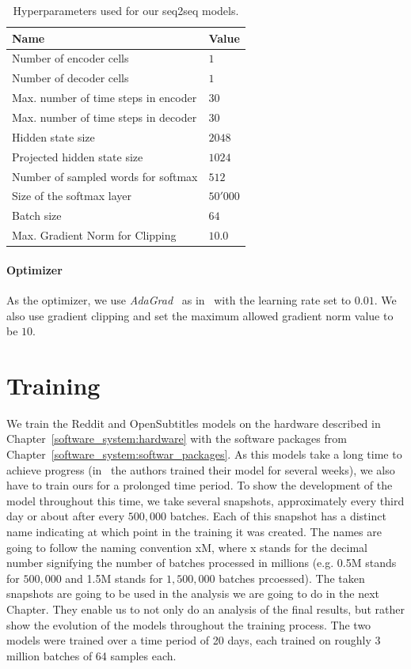 \begin{table}[H]
	\centering
	\begin{adjustbox}{max width=\textwidth}
		\begin{tabular}{ll}
			\toprule
			Name & Value\\ \midrule
			Number of encoder cells & $1$\\
			Number of decoder cells & $1$\\
			Max. number of time steps in encoder & $30$\\
			Max. number of time steps in decoder & $30$\\
			Hidden state size & $2048$\\
			Projected hidden state size & $1024$\\
			Number of sampled words for softmax & $512$\\
			Size of the softmax layer & $50'000$\\
			Batch size & $64$\\
			Max. Gradient Norm for Clipping & $10.0$\\
			\bottomrule
		\end{tabular}
	\end{adjustbox}
	\caption{Hyperparameters used for our seq2seq models.}
	\label{methods:hyperparameters:table}
\end{table}

\paragraph{Optimizer} As the optimizer, we use \emph{AdaGrad}~\cite{Duchi:2011} as in~\cite{Vinyals:2015} with the learning rate set to $0.01$. We also use gradient clipping \cite{Pascanu:2013} and set the maximum allowed gradient norm value to be $10$.

\section{Training}
\label{methods:training}
We train the Reddit and OpenSubtitles models on the hardware described in Chapter~\ref{software_system:hardware} with the software packages from Chapter~\ref{software_system:softwar_packages}. As this models take a long time to achieve progress (in~\cite{Vinyals:2015} the authors trained their model for several weeks), we also have to train ours for a prolonged time period. To show the development of the model throughout this time, we take several snapshots, approximately every third day or about after every $500,000$ batches. Each of this snapshot has a distinct name indicating at which point in the training it was created. The names are going to follow the naming convention xM, where x stands for the decimal number signifying the number of batches processed in millions (e.g. 0.5M stands for $500,000$ and 1.5M stands for $1,500,000$ batches prcoessed). The taken snapshots are going to be used in the analysis we are going to do in the next Chapter. They enable us to not only do an analysis of the final results, but rather show the evolution of the models throughout the training process. The two models were trained over a time period of 20 days, each trained on roughly 3 million batches of 64 samples each.


